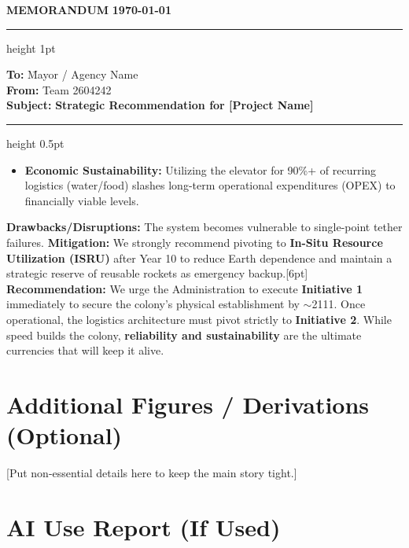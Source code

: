 \documentclass[11pt,letterpaper]{article}
\newcommand{\teamno}{2604242}
\newenvironment{memosheet}{%
    \clearpage
    \newgeometry{top=2cm, bottom=2cm, left=2.5cm, right=2.5cm} %
    \thispagestyle{empty}
    \begingroup
    \sffamily
    \noindent
    {\huge\bfseries\color{black!80} MEMORANDUM} \hfill \textbf{\today}
    \par\vspace{10pt}
    \hrule height 1pt
    \par\vspace{10pt}
    \begin{tabbing}
        \textbf{To:} \hspace{1cm} \= Mayor / Agency Name \\
        \textbf{From:} \> Team \teamno \\
        \textbf{Subject:} \> \textbf{Strategic Recommendation for [Project Name]}
    \end{tabbing}
    \par\vspace{5pt}
    \hrule height 0.5pt
    \par\vspace{15pt}
    \setlength{\parskip}{0.8em}
}{%
    \endgroup
    \restoregeometry
}
\begin{document}
\begin{memosheet}
\begin{itemize}
    \item \textbf{Economic Sustainability:} Utilizing the elevator for 90\%+ of recurring logistics (water/food) slashes long-term operational expenditures (OPEX) to financially viable levels.
\end{itemize}
\textbf{Drawbacks/Disruptions:} The system becomes vulnerable to single-point tether failures. \textbf{Mitigation:} We strongly recommend pivoting to \textbf{In-Situ Resource Utilization (ISRU)} after Year 10 to reduce Earth dependence and maintain a strategic reserve of reusable rockets as emergency backup.[6pt]
\textbf{Recommendation:} 
We urge the Administration to execute \textbf{Initiative 1} immediately to secure the colony's physical establishment by $\sim$2111. Once operational, the logistics architecture must pivot strictly to \textbf{Initiative 2}. While speed builds the colony, \textbf{reliability and sustainability} are the ultimate currencies that will keep it alive.

\end{memosheet}




\newpage
\nocite{*}  %

\newpage
\appendix
\section{Additional Figures / Derivations (Optional)}
[Put non-essential details here to keep the main story tight.]

\section*{AI Use Report (If Used)}
\end{document}
